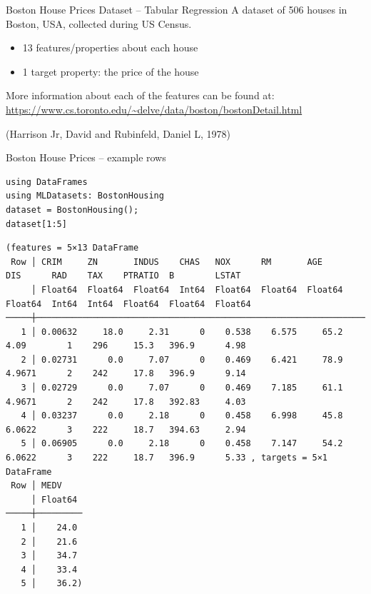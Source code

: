 \documentclass[10pt]{beamer}
\begin{document}
\begin{frame}[label={sec:orgf3cae79}]{Boston House Prices Dataset -- Tabular Regression}
A dataset of 506 houses in Boston, USA, collected during US Census.

\begin{itemize}
\item 13 features/properties about each house
\item 1 target property: the price of the house
\end{itemize}

More information about each of the features can be found at: \url{https://www.cs.toronto.edu/\~delve/data/boston/bostonDetail.html}

(Harrison Jr, David and Rubinfeld, Daniel L, 1978)
\end{frame}

\begin{frame}[label={sec:orgb4d52db},fragile]{Boston House Prices -- example rows}
 \begin{verbatim}
using DataFrames
using MLDatasets: BostonHousing
dataset = BostonHousing();
dataset[1:5]
\end{verbatim}

\begin{verbatim}
(features = 5×13 DataFrame
 Row │ CRIM     ZN       INDUS    CHAS   NOX      RM       AGE      DIS      RAD    TAX    PTRATIO  B        LSTAT   
     │ Float64  Float64  Float64  Int64  Float64  Float64  Float64  Float64  Int64  Int64  Float64  Float64  Float64 
─────┼────────────────────────────────────────────────────────────────────────────────────────────────────────────────
   1 │ 0.00632     18.0     2.31      0    0.538    6.575     65.2   4.09        1    296     15.3   396.9      4.98 
   2 │ 0.02731      0.0     7.07      0    0.469    6.421     78.9   4.9671      2    242     17.8   396.9      9.14
   3 │ 0.02729      0.0     7.07      0    0.469    7.185     61.1   4.9671      2    242     17.8   392.83     4.03
   4 │ 0.03237      0.0     2.18      0    0.458    6.998     45.8   6.0622      3    222     18.7   394.63     2.94
   5 │ 0.06905      0.0     2.18      0    0.458    7.147     54.2   6.0622      3    222     18.7   396.9      5.33 , targets = 5×1 DataFrame
 Row │ MEDV
     │ Float64
─────┼─────────
   1 │    24.0
   2 │    21.6
   3 │    34.7
   4 │    33.4
   5 │    36.2)
\end{verbatim}
\end{frame}
\end{document}
